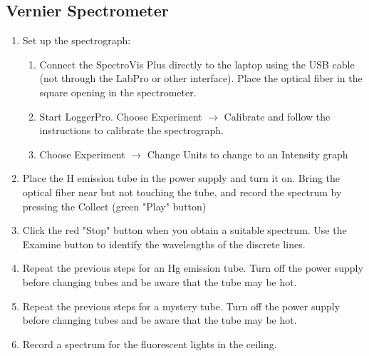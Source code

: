 \documentclass{article}
\begin{document}
\subsection{Vernier Spectrometer}

\begin{enumerate}
\item Set up the spectrograph:
\begin{enumerate}
\item Connect the SpectroVis Plus directly to the laptop using the USB cable (not through the LabPro or other interface).   Place the optical fiber in the square opening in the spectrometer.  
\item Start LoggerPro.  Choose Experiment $\rightarrow$ Calibrate and follow the instructions to calibrate the spectrograph.
\item Choose Experiment $\rightarrow$ Change Units to change to an Intensity graph
\end{enumerate}
\item Place the H emission tube in the power supply and turn it on.  Bring the optical fiber near but not touching the tube, and record the spectrum by pressing the Collect (green "Play" button)
\item Click the red "Stop" button when you obtain a suitable spectrum.  Use the Examine button to identify the wavelengths of the discrete lines.
\item Repeat the previous steps for an Hg emission tube.  Turn off the power supply before changing tubes and be aware that the tube may be hot.
\item Repeat the previous steps for a mystery tube.  Turn off the power supply before changing tubes and be aware that the tube may be hot.
\item Record a spectrum for the fluorescent lights in the ceiling.   
\end{enumerate}
\end{document}

